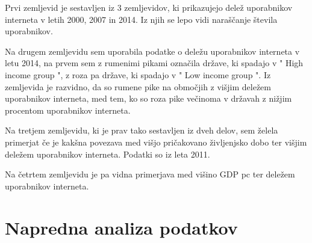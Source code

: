 \documentclass[11pt,a4paper]{article}
\begin{document}
Prvi zemljevid je sestavljen iz 3 zemljevidov, ki prikazujejo delež uporabnikov interneta v letih 2000, 2007 in 2014. Iz njih se lepo vidi naraščanje števila uporabnikov.

\newpage

\begin{figure}[htp] \centering{
}

\end{figure}  


\newpage

Na drugem zemljevidu sem uporabila podatke o deležu uporabnikov interneta v letu 2014, na prvem sem z rumenimi pikami označila države, ki spadajo v " High income group ", z roza pa države, ki spadajo v " Low income group ". Iz zemljevida je razvidno, da so rumene pike na območjih z višjim deležem uporabnikov interneta, med tem, ko so roza pike večinoma v državah z nižjim procentom uporabnikov interneta.


\begin{figure}[h!] 
\begin{center}
 
 \end{center}
\end{figure}

\newpage

Na tretjem zemljevidu, ki je prav tako sestavljen iz dveh delov, sem  želela primerjat če je kakšna povezava med višjo pričakovano življenjsko dobo ter višjim deležem uporabnikov interneta. Podatki so iz leta 2011. \\

\begin{figure}[h!]
\begin{center}
  
  \end{center}
\end{figure}

\newpage
Na četrtem zemljevidu je pa vidna primerjava med višino GDP pc ter deležem uporabnikov interneta.

\begin{figure}[h!]
\begin{center}
  
  \end{center}
\end{figure}

\newpage
\section{Napredna analiza podatkov}
\end{document}
